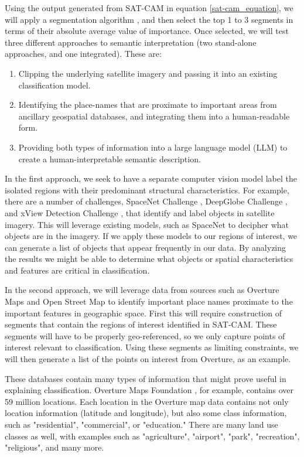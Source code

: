 Using the output generated from SAT-CAM in equation \ref{sat-cam_equation}, we will apply a segmentation algorithm \citep{kirillov2023segment}, and then select the top 1 to 3 segments in terms of their absolute average value of importance.  Once selected, we will test three different approaches to semantic interpretation (two stand-alone approaches, and one integrated).  These are:
\begin{enumerate}
\item Clipping the underlying satellite imagery and passing it into an existing classification model. 
\item Identifying the place-names that are proximate to important areas from ancillary geospatial databases, and integrating them into a human-readable form. 
\item Providing both types of information into a large language model (LLM) to create a human-interpretable semantic description. 
\end{enumerate}


In the first approach, we seek to have a separate computer vision model label the isolated regions with their predominant structural characteristics.  For example, there are a number of challenges, SpaceNet Challenge \citep{SpaceNet}, DeepGlobe Challenge \citep{DeepGlobe2018}, and xView Detection Challenge \citep{xView}, that identify and label objects in satellite imagery.  This will leverage existing models, such as SpaceNet to decipher what objects are in the imagery.  If we apply these models to our regions of interest, we can generate a list of objects that appear frequently in our data.  By analyzing the results we might be able to determine what objects or spatial characteristics and features are critical in classification.

In the second approach, we will leverage data from sources such as Overture Maps \citep{OvertureMapsFoundation2023} and Open Street Map \citep{OpenStreetMap2024} to identify important place names proximate to the important features in geographic space.  First this will require construction of segments that contain the regions of interest identified in SAT-CAM.  These segments will have to be properly geo-referenced, so we only capture points of interest relevant to classification.  Using these segments as limiting constraints, we will then generate a list of the points on interest from Overture, as an example.  

These databases contain many types of information that might prove useful in explaining classification.  Overture Maps Foundation \citep{OvertureMapsFoundation2023}, for example, contains over 59 million locations.  Each location in the Overture map data contains not only location information (latitude and longitude), but also some class information, such as "residential", "commercial", or "education."  There are many land use classes as well, with examples such as "agriculture", "airport", "park", "recreation", "religious", and many more.  

